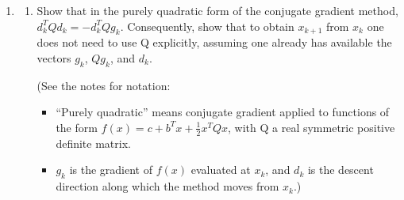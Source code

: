 \documentclass[conference,onecolumn]{IEEEtran}
\begin{document}
\begin{enumerate}
            Let $v_1$ and $v_2$ be eigenvectors of $Q$ corresponding to distinct eigenvalues $\lambda_1$ and $\lambda_2$ respectively, $\lambda_1 \neq \lambda_2$.
            Then we have:
            \begin{align*}
                  Qv_1 & = \lambda_1 v_1 \\
                  Qv_2 & = \lambda_2 v_2
            \end{align*}
            Then we can derive the 2 forms of $v_1^T Q v_2$:
            \begin{align}
                  v_1^T Q v_2 & = v_1^T \lambda_2 v_2 = \lambda_2 v_1^T v_2          \\
                  v_1^T Q v_2 & = v_1^T Q^T v_2 = (Qv_1)^T v_2 = \lambda_1 v_1^T v_2
            \end{align}
            Subtract (2) from (3) we get:
            \begin{align*}
                  (\lambda_2 - \lambda_1) v_1^T v_2 = 0
            \end{align*}
            Because $\lambda_1 \neq \lambda_2$, we have $v_1^T v_2 = 0$, the usual sense of orthogonal eigen vectors.

            Now plug this back into (2) or (3) we get:
            \begin{align*}
                  v_1^T Q v_2 = 0
            \end{align*}
            So $v_1$ and $v_2$ are $Q$-orthogonal.

            No code is needed or expected for this problem. Please put your work into the pdf.

            \clearpage
      \item \begin{enumerate}
                  \item Show that in the purely quadratic form of the conjugate gradient method, $d^T_k Qd_k = -d^T_k Qg_k$.
                        Consequently, show that to obtain $x_{k+1}$ from $x_k$ one does not need to use Q explicitly, assuming one already has available the vectors $g_k$, $Qg_k$, and $d_k$.

                        (See the notes for notation:
                        \begin{itemize}
                              \item “Purely quadratic” means conjugate gradient applied to functions of the form $f (x) = c + b^T x + \frac{1}{2} x^T Qx$, with Q a real symmetric positive definite matrix.
                              \item $g_k$ is the gradient of $f (x)$ evaluated at $x_k$, and $d_k$ is the descent direction along which the method moves from $x_k$.)
                        \end{itemize}


\end{enumerate}
\end{enumerate}
\end{document}
